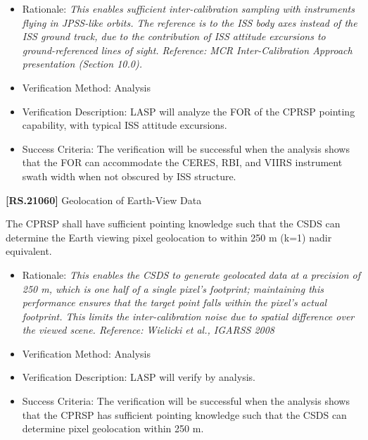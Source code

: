 \documentclass[12pt,oneside,oldfontcommands]{memoir}
\begin{document}
\begin{itemize}
\item{} Rationale: \emph{This enables sufficient inter-calibration sampling with instruments flying in JPSS-like orbits. The reference is to the ISS body axes instead of the ISS ground track, due to the contribution of ISS attitude excursions to ground-referenced lines of sight. Reference: MCR Inter-Calibration Approach presentation (Section 10.0).}

\item{} Verification Method: Analysis

\item{} Verification Description: \gls{LASP} will analyze the FOR of the \gls{CPRSP} \gls{point}ing capability, with typical \gls{ISS} attitude excursions.

\item{} Success Criteria: The verification will be successful when the \gls{analysis} shows that the FOR can accommodate the \gls{CERES}, \gls{RBI}, and \gls{VIIRS} instrument swath width when not obscured by \gls{ISS} structure.

\end{itemize}

\textbf{[RS.21060]} Geolocation of Earth-View Data

The \gls{CPRSP} shall have sufficient \gls{point}ing knowledge such that the \gls{CSDS} can determine the Earth viewing pixel geolocation to within 250 m (k=1) nadir equivalent.

\begin{itemize}
\item{} Rationale: \emph{This enables the CSDS to generate geolocated data at a precision of 250 m, which is one half of a single pixel's footprint; maintaining this performance ensures that the target point falls within the pixel's actual footprint. This limits the inter-calibration noise due to spatial difference over the viewed scene. Reference: Wielicki et al., IGARSS 2008}

\item{} Verification Method: Analysis

\item{} Verification Description: \gls{LASP} will verify by \gls{analysis}.

\item{} Success Criteria: The verification will be successful when the \gls{analysis} shows that the \gls{CPRSP} has sufficient \gls{point}ing knowledge such that the \gls{CSDS} can determine pixel geolocation within 250 m.

\end{itemize}
\end{document}
